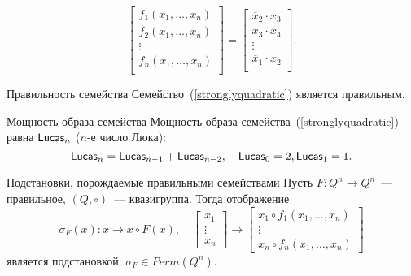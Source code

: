 \begin{frame}%
    \begin{equation}
        \label{stronglyquadratic}
        \begin{bmatrix}
            f_1(x_1, \ldots, x_n) \\
            f_2(x_1, \ldots, x_n) \\
            \vdots \\
            f_n(x_1, \ldots, x_n) \\
        \end{bmatrix}
        =
        \begin{bmatrix}
            \overline{x}_2 \cdot x_3 \\
            \overline{x}_3 \cdot x_4 \\
            \vdots \\
            \overline{x}_1 \cdot x_2 \\
        \end{bmatrix}.
    \end{equation}
    \pause
    \begin{mypropos}{Правильность семейства}
        Семейство~(\ref{stronglyquadratic}) является правильным.
    \end{mypropos}
    \pause
    \begin{mytheorem}{Мощность образа семейства}
        Мощность образа семейства~(\ref{stronglyquadratic}) равна $\mathsf{Lucas}_n$ ($n$-е число Люка):
        \[
            \mathsf{Lucas}_n = \mathsf{Lucas}_{n-1} + \mathsf{Lucas}_{n-2}, \quad \mathsf{Lucas}_0 = 2, \mathsf{Lucas}_1 = 1.
        \]
    \end{mytheorem}
\end{frame}


\begin{frame}{Подстановки, порождаемые правильными семействами}
    Пусть $F \colon Q^n \to Q^n$~--- правильное, $(Q, \circ)$~--- квазигруппа.
    Тогда отображение
    \[ 
        \sigma_F(x) \colon x \to x \circ F(x),
        \quad
        \begin{bmatrix}
            x_1 \\
            \vdots \\
            x_n
        \end{bmatrix} 
        \to 
        \begin{bmatrix}
            x_1 \circ f_1(x_1, \ldots, x_n) \\
            \vdots \\
            x_n \circ f_n(x_1, \ldots, x_n)
        \end{bmatrix}
    \]
    является подстановкой: $\sigma_F \in Perm(Q^n)$.
\end{frame}


